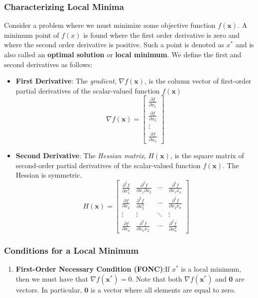 \documentclass[11pt]{article}
\begin{document}
\subsubsection{Characterizing Local Minima}
Consider a problem where we must minimize some objective function $f(\bm{x})$. A minimum point of $f(x)$ is found where the first order derivative is zero and where the second order derivative is positive. Such a point is denoted as $x^*$ and is also called an \textbf{optimal solution} or \textbf{local minimum}. We define the first and second derivatives as follows: 
\begin{itemize}
\item \textbf{First Derivative}: The \textit{gradient}, $\nabla f(\bm x)$,  is the column vector of first-order partial derivatives of the scalar-valued function $f( \bm x)$
$$\nabla f(\bm x) = \begin{bmatrix}
\frac{\partial f}{\partial x_1} \\ 
\frac{\partial f}{\partial x_2} \\ 
\vdots \\
\frac{\partial f}{\partial x_n} 
\end{bmatrix}$$
\item \textbf{Second Derivative}: The \textit{Hessian matrix}, $H(\bm x)$, is the square matrix of second-order partial derivatives of the scalar-valued function $f(\bm x)$. The Hessian is symmetric.
$$\ H(\bm x) = \begin{bmatrix}
\frac{\partial ^2 f}{\partial x^2_1}    &   \frac{\partial ^2 f}{\partial x_1 \partial x_2}  &  \cdots  &   \frac{\partial ^2 f}{\partial x_1 x_n} \\ 
\frac{\partial f}{\partial x_2} & \frac{\partial ^2 f}{\partial x^2_2}  & \cdots &  \frac{\partial ^2 f}{\partial x_2 x_n}  \\ 
\vdots & \vdots & \ddots & \vdots \\
\frac{\partial f}{\partial x_n} & \frac{\partial ^2 f}{\partial x_n x_2} & \cdots & \frac{\partial ^2 f}{\partial x^2_n}
\end{bmatrix}$$
\end{itemize}
\subsubsection{Conditions for a Local Minimum}
\begin{enumerate}
\item \textbf{First-Order Necessary Condition (FONC)}:If $x^*$ is a local minimum, then we must have that $\nabla f( \bm {x^*}) = 0$. Note that both $\nabla f( \bm {x^*} )$ and $\bm 0$ are vectors. In particular,  $\bm 0$ is a vector where all elements are equal to zero.
\end{enumerate}
\end{document}
